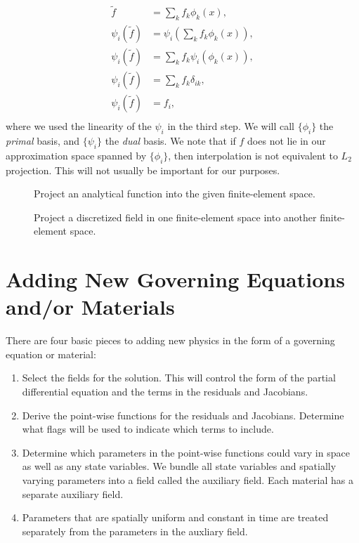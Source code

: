 \begin{align}
  \tilde f &= \sum_k f_k \phi_k(x),\\
  \psi_i(\tilde f) &= \psi_i(\sum_k f_k \phi_k(x)),\\
  \psi_i(\tilde f) &= \sum_k f_k \psi_i(\phi_k(x)),\\
  \psi_i(\tilde f) &= \sum_k f_k \delta_{ik},\\
  \psi_i(\tilde f) &= f_i,\\
\end{align}
where we used the linearity of the $\psi_i$ in the third step. We will call $\{\phi_i\}$ the \textit{primal} basis, and
$\{\psi_i\}$ the \textit{dual} basis. We note that if $f$ does not lie in our approximation space spanned by
$\{\phi_i\}$, then interpolation is not equivalent to $L_2$ projection. This will not usually be important for our
purposes.

\begin{description}
\item[] Project an analytical function
  into the given finite-element space.
\item[] Project a discretized field in one
  finite-element space into another finite-element space.
\end{description}


\section{Adding New Governing Equations and/or Materials}

There are four basic pieces to adding new physics in the form of a
governing equation or material:
\begin{enumerate}
\item Select the fields for the solution. This will control the form
  of the partial differential equation and the terms in the residuals
  and Jacobians.
\item Derive the point-wise functions for the residuals and
  Jacobians. Determine what flags will be used to indicate which terms
  to include.
\item Determine which parameters in the point-wise functions could
  vary in space as well as any state variables. We bundle all state variables
  and spatially varying parameters into a field called the auxiliary
  field. Each material has a separate auxiliary field.
\item Parameters that are spatially uniform and constant in time
  are treated separately from the parameters in the auxliary field.
\end{enumerate}

